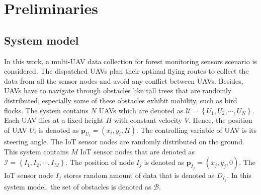 \documentclass[conference]{IEEEtran}
\begin{document}
\section{Preliminaries}\label{pre}
\subsection{System model}\label{sys_model}
In this work, a multi-UAV data collection for forest monitoring sensors scenario is considered. The dispatched UAVs plan their optimal flying routes to collect the data from all the sensor nodes and avoid any conflict between UAVs. Besides, UAVs have to navigate through obstacles like tall trees that are randomly distributed, especially some of these obstacles exhibit mobility, such as bird flocks. The system contains $N$ UAVs which are denoted as $\mathcal{U}=\left\{U_1, U_2, \cdots , U_N\right\}$. Each UAV flies at a fixed height $H$ with constant velocity $V$. Hence, the position of UAV $U_i$ is denoted as $\mathbf{p}_{U_i}=\left(x_{i},y_{i},H\right)$. The controlling variable of UAV is its steering angle. 
The IoT sensor nodes are randomly distributed on the ground. This system contains $M$ IoT sensor nodes that are denoted as $\mathcal{I}=\left\{I_1, I_2, \cdots , I_M\right\}$. The position of node $I_j$ is denoted as $\mathbf{p}_{I_j}=\left(x_{j},y_{j},0\right)$. The IoT sensor node $I_j$ stores random amount of data that is denoted as $D_{I_j}$. 
In this system model, the set of obstacles is denoted as $\mathcal{B}$. 
\end{document}
